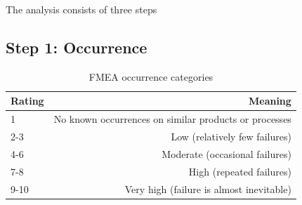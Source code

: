 The analysis consists of three steps
\subsection*{Step 1: Occurrence}


\begin{table}[h]
\centering
    \begin{tabular}{ | l | r | }
    \hline
    Rating & Meaning \\ \hline \hline
    1      & No known occurrences on similar products or processes  \\ \hline
    2-3    & Low (relatively few failures) \\ \hline
    4-6    & Moderate (occasional failures) \\ \hline
    7-8    & High (repeated failures) \\ \hline
    9-10   & Very high (failure is almost inevitable) \\ \hline
    \end{tabular}
\caption{FMEA occurrence categories}
\label{table:fmea_occurrence}
\end{table}

